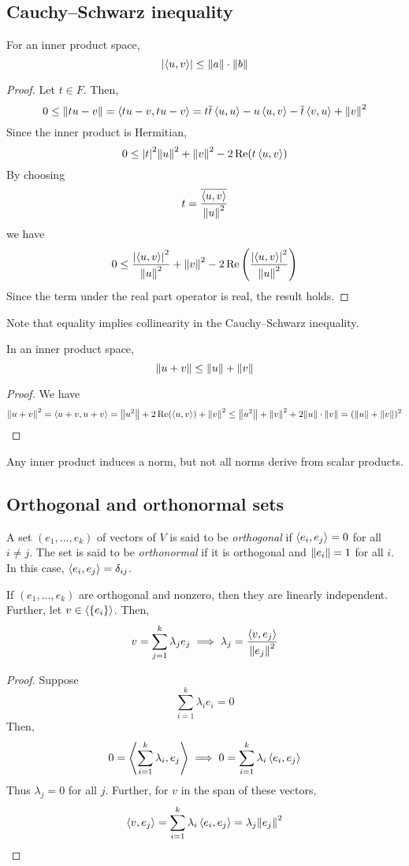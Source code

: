 \subsection{Cauchy--Schwarz inequality}
\begin{lemma}
	For an inner product space,
	\[
		\abs{\left\langle{u,v}\right\rangle} \leq \norm{a} \cdot \norm{b}
	\]
\end{lemma}
\begin{proof}
	Let \( t \in F \).
	Then,
	\[
		0 \leq \norm{t u - v} = \left\langle{tu - v, tu - v}\right\rangle = t \overline t \left\langle{u,u}\right\rangle - u \left\langle{u,v}\right\rangle - \overline t \left\langle{v,u}\right\rangle + \norm{v}^2
	\]
	Since the inner product is Hermitian,
	\[
		0 \leq \abs{t}^2 \norm{u}^2 + \norm{v}^2 - 2 \operatorname{Re}(t \left\langle{u,v}\right\rangle)
	\]
	By choosing
	\[
		t = \frac{\overline{\left\langle{u,v}\right\rangle}}{\norm{u}^2}
	\]
	we have
	\[
		0 \leq \frac{\abs{\left\langle{u,v}\right\rangle}^2}{\norm{u}^2} + \norm{v}^2 - 2 \operatorname{Re}\qty(\frac{\abs{\left\langle{u,v}\right\rangle}^2}{\norm{u}^2})
	\]
	Since the term under the real part operator is real, the result holds.
\end{proof}
Note that equality implies collinearity in the Cauchy--Schwarz inequality.
\begin{corollary}
	In an inner product space,
	\[
		\norm{u+v} \leq \norm{u} + \norm{v}
	\]
\end{corollary}
\begin{proof}
	We have
	\[
		\norm{u+v}^2 = \left\langle{u+v, u+v}\right\rangle = \norm{u^2} + 2 \operatorname{Re}(\left\langle{u,v}\right\rangle) + \norm{v}^2 \leq \norm{u^2} + \norm{v}^2 + 2 \norm{u} \cdot \norm{v} = (\norm{u} + \norm{v})^2
	\]
\end{proof}
\begin{remark}
	Any inner product induces a norm, but not all norms derive from scalar products.
\end{remark}

\subsection{Orthogonal and orthonormal sets}
\begin{definition}
	A set \( (e_1, \dots, e_k) \) of vectors of \( V \) is said to be \textit{orthogonal} if \( \left\langle{e_i, e_j}\right\rangle = 0 \) for all \( i \neq j \).
	The set is said to be \textit{orthonormal} if it is orthogonal and \( \norm{e_i} = 1 \) for all \( i \).
	In this case, \( \left\langle{e_i, e_j}\right\rangle = \delta_{ij} \).
\end{definition}
\begin{lemma}
	If \( (e_1, \dots, e_k) \) are orthogonal and nonzero, then they are linearly independent.
	Further, let \( v \in \left\langle{} \qty{e_i} \right\rangle \).
	Then,
	\[
		v = \sum_{j=1}^k \lambda_j e_j \implies \lambda_j = \frac{\left\langle{v, e_j}\right\rangle}{\norm{e_j}^2}
	\]
\end{lemma}
\begin{proof}
	Suppose
	\[
		\sum_{i=1}^k \lambda_i e_i = 0
	\]
	Then,
	\[
		0 = \left\langle{\sum_{i=1}^k \lambda_i, e_j}\right\rangle \implies 0 = \sum_{i=1}^k \lambda_i \left\langle{e_i, e_j}\right\rangle
	\]
	Thus \( \lambda_j = 0 \) for all \( j \).
	Further, for \( v \) in the span of these vectors,
	\[
		\left\langle{v, e_j}\right\rangle = \sum_{i=1}^k \lambda_i \left\langle{e_i, e_j}\right\rangle = \lambda_j \norm{e_j}^2
	\]
\end{proof}

